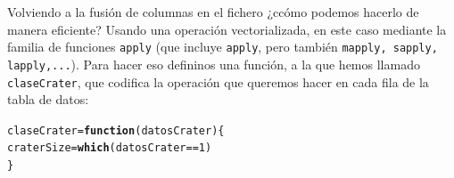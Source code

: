 \documentclass[10pt,a4paper]{article}\usepackage[]{graphicx}\usepackage[]{color}
\makeatletter
\newcommand{\hlnum}[1]{\textcolor[rgb]{0.686,0.059,0.569}{#1}}%
\newcommand{\hlopt}[1]{\textcolor[rgb]{0,0,0}{#1}}%
\newcommand{\hlstd}[1]{\textcolor[rgb]{0.345,0.345,0.345}{#1}}%
\newcommand{\hlkwa}[1]{\textcolor[rgb]{0.161,0.373,0.58}{\textbf{#1}}}%
\newcommand{\hlkwb}[1]{\textcolor[rgb]{0.69,0.353,0.396}{#1}}%
\newcommand{\hlkwc}[1]{\textcolor[rgb]{0.333,0.667,0.333}{#1}}%
\newcommand{\hlkwd}[1]{\textcolor[rgb]{0.737,0.353,0.396}{\textbf{#1}}}%
\newenvironment{kframe}{%
 \def\at@end@of@kframe{}%
 \ifinner\ifhmode%
  \def\at@end@of@kframe{\end{minipage}}%
  \begin{minipage}{\columnwidth}%
 \fi\fi%
 \def\FrameCommand##1{\hskip\@totalleftmargin \hskip-\fboxsep
 \colorbox{shadecolor}{##1}\hskip-\fboxsep
     \hskip-\linewidth \hskip-\@totalleftmargin \hskip\columnwidth}%
 \MakeFramed {\advance\hsize-\width
   \@totalleftmargin\z@ \linewidth\hsize
   \@setminipage}}%
 {\par\unskip\endMakeFramed%
 \at@end@of@kframe}
\newenvironment{knitrout}{}{} %
\makeatother
\begin{document}
Volviendo a la fusión de columnas en el fichero ¿ccómo podemos hacerlo de manera eficiente? Usando una operación vectorializada, en este caso mediante la familia de funciones {\tt apply} (que incluye {\tt apply}, pero también {\tt mapply, sapply, lapply,...}). Para hacer eso defininos una función, a la que hemos llamado {\tt claseCrater}, que codifica la operación que queremos hacer en cada fila de la tabla de datos:
\begin{knitrout}
\color{fgcolor}\begin{kframe}
\begin{alltt}
\hlstd{claseCrater} \hlkwb{=} \hlkwa{function}\hlstd{(}\hlkwc{datosCrater}\hlstd{)\{}
  \hlstd{craterSize} \hlkwb{=} \hlkwd{which}\hlstd{(datosCrater} \hlopt{==} \hlnum{1}\hlstd{)}
\hlstd{\}}
\end{alltt}
\end{kframe}
\end{knitrout}
\end{document}

